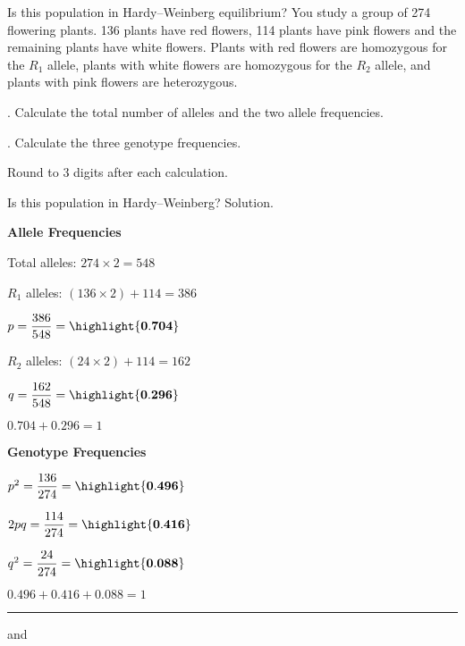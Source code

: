 \documentclass[t]{beamer}
\begin{document}
%
\begin{frame}{Is this population in Hardy--Weinberg equilibrium?}
	\hangpara You study a group of 274 flowering plants.  136 plants have red flowers, 114 plants have pink flowers and the remaining plants have white flowers. Plants with red flowers are homozygous for the $R_1$ allele, plants with white flowers are homozygous for the $R_2$ allele, and plants with pink flowers are heterozygous.

	. Calculate the total number of alleles and the two allele frequencies.

	. Calculate the three genotype frequencies.

	\hangpara Round to 3 digits after each calculation.
\end{frame}
%
{
\begin{frame}{Is this population in Hardy--Weinberg? Solution.}
\begin{multicols}{2}

	\hangpara \textbf{Allele Frequencies}
	
	\hangpara Total alleles: $274 \times 2 = 548$
	
	\hangpara $R_1$ alleles: $(136 \times 2) + 114 = 386$
	
	\hangpara $p = \dfrac{386}{548} = \highlight{\mathbf{0.704}}$

	\hangpara $R_2$ alleles: $(24 \times 2) + 114 = 162$ 

	\hangpara $q = \dfrac{162}{548} = \highlight{\mathbf{0.296}}$
	
	\hangpara $0.704 + 0.296 = 1$ \checkmark

\columnbreak

	\hangpara \textbf{Genotype Frequencies}
	
	\hangpara $p^2 = \dfrac{136}{274} = \highlight{\mathbf{0.496}}$ 

	\hangpara $2pq = \dfrac{114}{274} = \highlight{\mathbf{0.416}}$

	\hangpara $q^2 = \dfrac{24}{274} = \highlight{\mathbf{0.088}}$

	\hangpara $0.496 + 0.416 + 0.088 = 1$ \checkmark
	
	\rule{0.4\textwidth}{0.1pt}\vspace{-0.5\baselineskip}
	
	\hangpara {} and
	

\end{multicols}
\end{frame}
}
%
\end{document}

